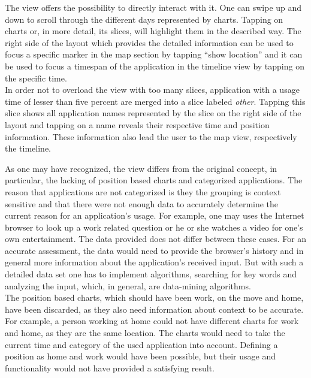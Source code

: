 The  view offers the possibility to directly interact with it. One can swipe up and down to scroll through the different days represented by charts. Tapping on charts or, in more detail, its slices, will highlight them in the described way. The right side of the layout which provides the detailed information can be used to focus a specific marker in the map section by tapping ``show location'' and it can be used to focus a timespan of the application in the timeline view by tapping on the specific time.\\
In order not to overload the view with too many slices, application with a usage time of lesser than five percent are merged into a slice labeled \emph{other}. Tapping this slice shows all application names represented by the slice on the right side of the layout and tapping on a name reveals their respective time and position information. These information also lead the user to the map view, respectively the timeline.

As  one may have recognized, the view differs from the original concept, in particular, the lacking of position based charts and categorized applications. The reason that applications are not categorized is they the grouping is context sensitive and that there were not enough data to accurately determine the current reason for an application's usage. For example, one may uses the Internet browser to look up a work related question or he or she watches a video for one's own entertainment. The data provided does not differ between these cases. For an accurate assessment, the data would need to provide the browser's history and in general more information about the application's received input. But with such a detailed data set one has to implement algorithms, searching for key words and analyzing the input, which, in general, are data-mining algorithms.\\
The position based charts, which should have been work, on the move and home, have been discarded, as they also need information about context to be accurate. For example, a person working at home could not have different charts for work and home, as they are the same location. The charts would need to take the current time and category of the used application into account. Defining a position as home and work would have been possible, but their usage and functionality would not have provided a satisfying result.

